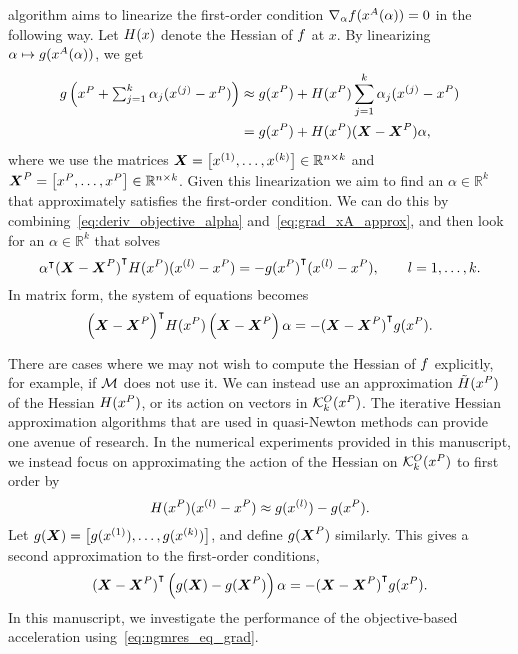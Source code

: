 \documentclass[main.tex]{subfiles}
\begin{document}
algorithm aims to linearize the first-order condition
$\nabla_\alpha f(x^A(\alpha))=0$ in the following way. Let
$H(x)$ denote the Hessian of $f$ at $x$. By linearizing
$\alpha\mapsto\nobreak g(x^A(\alpha))$, we get
\begin{align}\label{eq:grad_xA_approx}
  \begin{split}
    g\left({\textstyle
        x^P+\sum_{j=1}^k\alpha_j(x^{(j)}-x^P)}\right) &\approx
    g(x^P) + H(x^P)
    \sum_{j=1}^k\alpha_j(x^{(j)}-x^P)\\
    &= g(x^P) +H(x^P)(\boldsymbol{X}-\boldsymbol{X}^P)\alpha,
  \end{split}
\end{align}
where we use the matrices
$\boldsymbol{X} = \left[x^{(1)},\dots,x^{(k)}\right]\in\mathbb{R}^{n\times
  k}$ and
$\boldsymbol{X}^P = \left[x^P,\dots,x^P\right]\in\mathbb{R}^{n\times k}$.
Given this linearization we aim to find an $\alpha\in\mathbb{R}^k$
that approximately satisfies the first-order
condition. %
We can do this by combining~\eqref{eq:deriv_objective_alpha}
and~\eqref{eq:grad_xA_approx}, and then look for an
$\alpha\in\mathbb{R}^k$ that solves
\begin{equation}
  \alpha^\intercal{(\boldsymbol{X}-\boldsymbol{X}^P)}^\intercal H(x^P)
  (x^{(l)}-x^P) = -{g(x^P)}^\intercal(x^{(l)}-x^P),\qquad l=1,\dots,k.
\end{equation}
In matrix form, the system of equations becomes
\begin{equation}\label{eq:ngmres_eq_hess}
  {\left(\boldsymbol{X}-\boldsymbol{X}^P\right)}^\intercal H(x^P)
  \left(\boldsymbol{X}-\boldsymbol{X}^P\right)
  \alpha
  = -{(\boldsymbol{X}-\boldsymbol{X}^P)}^\intercal{g(x^P)}.
\end{equation}

There are cases where we may not wish to compute the Hessian of $f$
explicitly, for example, if $\mathcal{M}$ does not use it.  We can instead
use an approximation $\tilde{H}(x^P)$ of the Hessian
$H(x^P)$, or its action on vectors in $\mathcal{K}_{k}^O(x^P)$.  The
iterative Hessian approximation algorithms that are used in
quasi-Newton methods can provide one avenue of research.  In the
numerical experiments provided in this manuscript, we instead focus on
approximating the action of the Hessian on $\mathcal{K}_{k}^O(x^P)$ to first
order by
\begin{equation}\label{eq:approx_hess}
  H(x^P) (x^{(l)}-x^P)
  \approx g(x^{(l)})-g(x^P).
\end{equation}
Let
$g(\boldsymbol{X}) = \left[g(x^{(1)}),\dots,g(x^{(k)})\right]$,
and define $g(\boldsymbol{X}^P)$ similarly.  This gives a second
approximation to the first-order conditions,
\begin{equation}\label{eq:ngmres_eq_grad}
  {(\boldsymbol{X}-\boldsymbol{X}^P)}^\intercal\left(
    g(\boldsymbol{X})-g(\boldsymbol{X}^P)
  \right)
  \alpha
  = -{(\boldsymbol{X}-\boldsymbol{X}^P)}^\intercal{g(x^P)}.
\end{equation}
In this manuscript, we investigate the performance of the
objective-based acceleration using~\eqref{eq:ngmres_eq_grad}.
\end{document}
